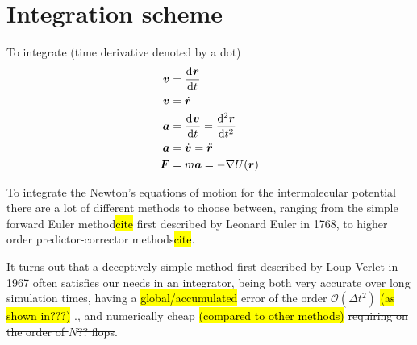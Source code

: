 \section{Integration scheme}





To integrate (time derivative denoted by a dot)
\begin{align*}
    \vvec &= \dod{\rvec}{t} \\
    \vvec &= \dot \rvec \\
    \avec &= \dod{\vvec}{t} = \dod[2]{\rvec}{t} \\
    \avec &= \dot\vvec = \ddot\rvec \\
    \Fvec &= m\avec = -\nabla U(\rvec)
\end{align*}


To integrate the Newton's equations of motion for the intermolecular potential there are a lot of different methods to choose between, ranging from the simple forward Euler method\hl{cite} first described by Leonard Euler in 1768, to higher order predictor-corrector methods\hl{cite}. 




It turns out that a deceptively simple method first described by Loup Verlet in 1967\cite{verlet1967computer} often satisfies our needs in an integrator, being both very accurate over long simulation times, having a \hl{global/accumulated} error of the order $\mathcal{O}(\Delta t^2)$ \hl{(as shown in???)} ., and numerically cheap \hl{(compared to other methods)} \st{requiring on the order of $N$?? flops}.



